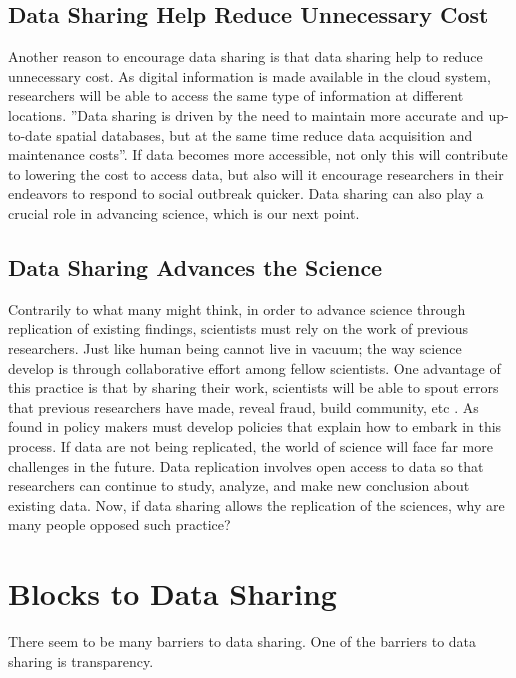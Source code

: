 \documentclass[sigconf]{acmart}
\begin{document}
\subsection{Data Sharing Help Reduce Unnecessary Cost
}

Another reason to encourage data sharing is that data sharing help to reduce unnecessary cost. As digital information is made available in the cloud system, researchers will be able to access the same type of information at different locations.  ''Data sharing is driven by the need to maintain more accurate and up-to-date spatial databases, but at the same time reduce data acquisition and maintenance costs''\cite{stoakes2005data}. If data becomes more accessible, not only this will contribute to lowering the cost to access data, but also will it encourage researchers in their endeavors to respond to social outbreak quicker. Data sharing can also play a crucial role in advancing science, which is our next point. 

\subsection{Data Sharing Advances the Science}

Contrarily to what many might think, in order to advance science through replication of existing findings, scientists must rely on the work of previous researchers. Just like human being cannot live in vacuum; the way science develop is through collaborative effort among fellow scientists. One advantage of this practice is that by sharing their work, scientists will be able to spout errors that previous researchers have made, reveal fraud, build community, etc \cite{leetaru2016}. As found in \cite{borgman2012conundrum} policy makers must develop policies that explain how to embark in this process. If data are not being replicated, the world of science will face far more challenges in the future. Data replication involves open access to data so that researchers can continue to study, analyze, and make new conclusion about existing data. Now, if data sharing allows the replication of the sciences, why are many people opposed such practice? 

\section{Blocks to Data Sharing}

There seem to be many barriers to data sharing. One of the barriers to data sharing is transparency. 
\end{document}
